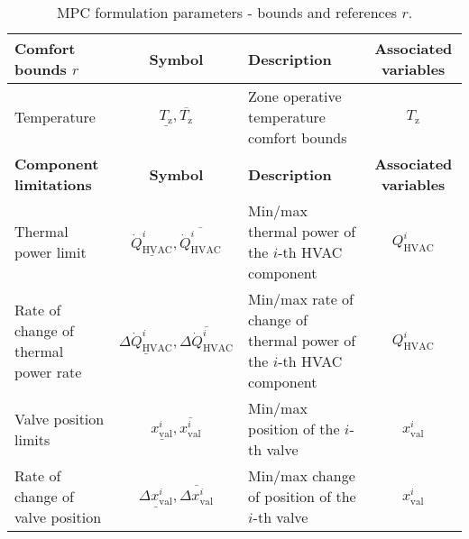 \documentclass[10pt]{extarticle}
\begin{document}
\renewcommand{\arraystretch}{2}
\begin{table}[ht]
	\centering
	\caption{MPC formulation parameters - bounds and references $r$.}
	\label{tab:mpc_form:parameters:bounds}
	\begin{tabular}{l|c|l|c}
		\toprule
		\textbf{Comfort bounds $r$}  & \textbf{Symbol} &  \textbf{Description} & \textbf{Associated variables} \\
		\midrule
		Temperature & $\underline{T_{\text{z}}},\overline{T_{\text{z}}}$ & \makecell[l]{Zone operative temperature  \\ comfort bounds } & $T_{\text{z}}$ \\
		\bottomrule 
		\textbf{Component limitations}  & \textbf{Symbol} &  \textbf{Description} & \textbf{Associated variables} \\
		\midrule
		Thermal power limit & $\underline{\dot{Q}^i_{\text{HVAC}}},\overline{\dot{Q}^i_{\text{HVAC}}}$ & \makecell[l]{Min/max thermal power of \\ the $i$-th HVAC component} & $Q^i_{\text{HVAC}}$ \\
		\makecell[l]{Rate of change of\\ thermal power rate}  & $\underline{\Delta \dot{Q}^i_{\text{HVAC}}},\overline{\Delta \dot{Q}^i_{\text{HVAC}}}$ & \makecell[l]{Min/max rate of change of  thermal  \\ power  of the  $i$-th HVAC component} & $Q^i_{\text{HVAC}}$ \\
		Valve position limits & $\underline{ x^i_{\text{val}}},\overline{ x^i_{\text{val}}}$ & \makecell[l]{Min/max position of \\  the  $i$-th valve} & $x^i_{\text{val}}$ \\
		\makecell[l]{Rate of change of\\ valve position}  & $\underline{\Delta x^i_{\text{val}}},\overline{\Delta x^i_{\text{val}}}$ & \makecell[l]{Min/max change of \\ position of the  $i$-th valve} & $x^i_{\text{val}}$ \\
		\bottomrule 
	\end{tabular}
\end{table}
\end{document}
